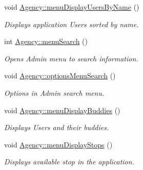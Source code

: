 \begin{DoxyCompactItemize}
\mbox{\label{group___agency_ga6d95d9219a22e771f77306eca2970f7f}} 
void \hyperlink{group___agency_ga6d95d9219a22e771f77306eca2970f7f}{Agency\+::menu\+Display\+Users\+By\+Name} ()
\begin{DoxyCompactList}\small\item\em Displays application Users sorted by name. \end{DoxyCompactList}\item 
\mbox{\label{group___agency_gacdf25fd2da688fccf730ffb5d63f8ea2}} 
int \hyperlink{group___agency_gacdf25fd2da688fccf730ffb5d63f8ea2}{Agency\+::menu\+Search} ()
\begin{DoxyCompactList}\small\item\em Opens Admin menu to search information. \end{DoxyCompactList}\item 
\mbox{\label{group___agency_ga4b51dfec7cdca417730d613ef5ec1d42}} 
void \hyperlink{group___agency_ga4b51dfec7cdca417730d613ef5ec1d42}{Agency\+::options\+Menu\+Search} ()
\begin{DoxyCompactList}\small\item\em Options in Admin search menu. \end{DoxyCompactList}\item 
\mbox{\label{group___agency_ga6ff3272c35880d3a599fe3ebb6ef3280}} 
void \hyperlink{group___agency_ga6ff3272c35880d3a599fe3ebb6ef3280}{Agency\+::menu\+Display\+Buddies} ()
\begin{DoxyCompactList}\small\item\em Displays Users and their buddies. \end{DoxyCompactList}\item 
\mbox{\label{group___agency_ga5551ae0256b60e7279a8673c7f1b6121}} 
void \hyperlink{group___agency_ga5551ae0256b60e7279a8673c7f1b6121}{Agency\+::menu\+Display\+Stops} ()
\begin{DoxyCompactList}\small\item\em Displays available stop in the application. \end{DoxyCompactList}\item 
\mbox{\label{group___agency_gae4890fb51527fa95db0e22780f867ecf}} 

\end{DoxyCompactItemize}
